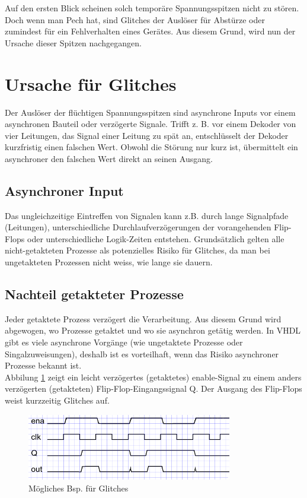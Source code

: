 Auf den ersten Blick scheinen solch temporäre Spannungsspitzen nicht zu stören. Doch wenn man Pech hat, sind Glitches der Auslöser für Abstürze oder zumindest für ein Fehlverhalten eines Gerätes. Aus diesem Grund, wird nun der Ursache dieser Spitzen nachgegangen.\\ 



\section{Ursache für Glitches}\label{sect.glitch_ursache}
Der Auslöser der flüchtigen Spannungsspitzen sind asynchrone Inputs vor einem asynchronen Bauteil oder verzögerte Signale. Trifft z. B. vor einem Dekoder von vier Leitungen, das Signal einer Leitung zu spät an, entschlüsselt der Dekoder kurzfristig einen falschen Wert. Obwohl die Störung nur kurz ist, übermittelt ein asynchroner den falschen Wert direkt an seinen Ausgang. \\

\subsection{Asynchroner Input}
Das ungleichzeitige Eintreffen von Signalen kann z.B. durch lange Signalpfade (Leitungen), unterschiedliche Durchlaufverzögerungen der vorangehenden Flip-Flops oder unterschiedliche Logik-Zeiten entstehen. Grundsätzlich gelten alle nicht-getakteten Prozesse als potenzielles Risiko für Glitches, da man bei ungetakteten Prozessen nicht weiss, wie lange sie dauern.\\

\subsection{Nachteil getakteter Prozesse}
Jeder getaktete Prozess verzögert die Verarbeitung. Aus diesem Grund wird abgewogen, wo Prozesse getaktet und wo sie asynchron getätig werden. In VHDL gibt es viele asynchrone Vorgänge (wie ungetaktete Prozesse oder Singalzuweisungen), deshalb ist es vorteilhaft, wenn das Risiko asynchroner Prozesse bekannt ist.\\


Abbilung \ref{fig.glitch.bild1} zeigt ein leicht verzögertes (getaktetes) enable-Signal zu einem anders verzögerten (getakteten) Flip-Flop-Eingangssignal Q. Der Ausgang des Flip-Flops weist kurzzeitig Glitches auf. \\
\begin{figure}[H]
	\centering
	\includegraphics[width=0.8\textwidth]{images/glitch/def_glitch_3.png}
	\caption{Mögliches Bsp. für Glitches}
	\label{fig.glitch.bild1}
\end{figure}



